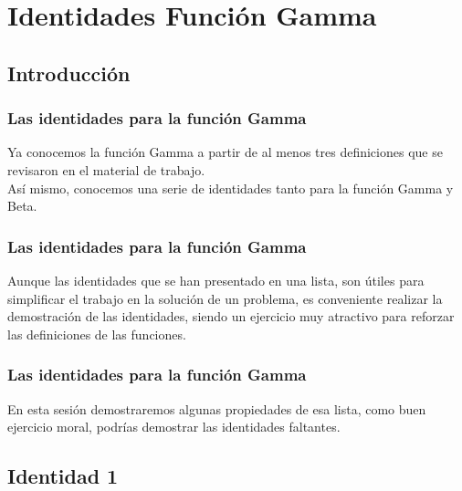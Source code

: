 \documentclass[12pt]{beamer}
\begin{document}
\section{Identidades Función Gamma}

\subsection{Introducción}
\begin{frame}
\frametitle{Las identidades para la función Gamma}
Ya conocemos la función Gamma a partir de al menos tres definiciones que se revisaron en el material de trabajo.
\\
\bigskip
\pause
Así mismo, conocemos una serie de identidades tanto para la función Gamma y Beta.
\end{frame}
\begin{frame}
\frametitle{Las identidades para la función Gamma}
Aunque las identidades que se han presentado en una lista, son útiles para simplificar el trabajo en la solución de un problema, es conveniente realizar la demostración de las identidades, siendo un ejercicio muy atractivo para reforzar las definiciones de las funciones.
\end{frame}
\begin{frame}
\frametitle{Las identidades para la función Gamma}
En esta sesión demostraremos algunas propiedades de esa lista, como buen ejercicio moral, podrías demostrar las identidades faltantes.
\end{frame}

\subsection{Identidad 1}
\end{document}
